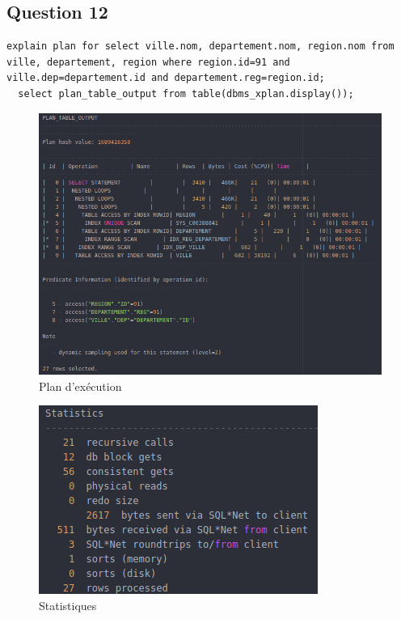 \documentclass[a4paper,12pt]{article}
\begin{document}
\newpage

\subsection{Question 12}
\begin{lstlisting}[caption={requêtes permettant d'expliquer le plan d'exécution affichant le nom des villes, de leurs départements et de la région pour la région dont le numéro (id) est 91}]
  explain plan for select ville.nom, departement.nom, region.nom from ville, departement, region where region.id=91 and ville.dep=departement.id and departement.reg=region.id;
  select plan_table_output from table(dbms_xplan.display());
\end{lstlisting}

\begin{figure}[!ht]
  \centering
  \includegraphics[scale=0.6]{images/q12_1.png}
  \caption{Plan d'exécution}
\end{figure}

\begin{figure}[!ht]
  \centering
  \includegraphics[scale=0.6]{images/q12_2.png}
  \caption{Statistiques}
\end{figure}
\end{document}
